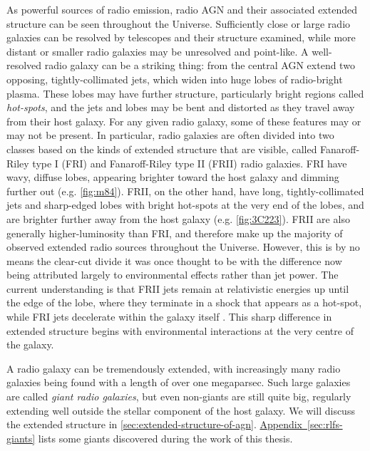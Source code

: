 \documentclass[11pt, a4paper]{book}
\newcommand{\aref}[1]{\hyperref[#1]{Appendix~\ref{#1}}}
\newcommand{\defn}[1]{\emph{#1}}
\providecommand{\DIFaddbegin}{} %
\providecommand{\DIFaddend}{} %
\providecommand{\DIFdelbegin}{} %
\providecommand{\DIFdelend}{} %
\newcommand{\DIFscaledelfig}{0.5}
\newlength{\DIFdelgraphicswidth} %
\newlength{\DIFdelgraphicsheight} %
\newcommand{\DIFaddincludegraphics}[2][]{{\color{blue}\fbox{\DIFOincludegraphics[#1]{#2}}}} %
\newcommand{\DIFdelincludegraphics}[2][]{%
\sbox{\DIFdelgraphicsbox}{\DIFOincludegraphics[#1]{#2}}%
\settoboxwidth{\DIFdelgraphicswidth}{\DIFdelgraphicsbox} %
\settoboxtotalheight{\DIFdelgraphicsheight}{\DIFdelgraphicsbox} %
\scalebox{\DIFscaledelfig}{%
\parbox[b]{\DIFdelgraphicswidth}{\usebox{\DIFdelgraphicsbox}\\[-\baselineskip] \rule{\DIFdelgraphicswidth}{0em}}\llap{\resizebox{\DIFdelgraphicswidth}{\DIFdelgraphicsheight}{%
\setlength{\unitlength}{\DIFdelgraphicswidth}%
\begin{picture}(1,1)%
\thicklines\linethickness{2pt} %
{\color[rgb]{1,0,0}\put(0,0){\framebox(1,1){}}}%
{\color[rgb]{1,0,0}\put(0,0){\line( 1,1){1}}}%
{\color[rgb]{1,0,0}\put(0,1){\line(1,-1){1}}}%
\end{picture}%
}\hspace*{3pt}}} %
} %
\DeclareRobustCommand{\DIFaddbegin}{\DIFOaddbegin \let\includegraphics\DIFaddincludegraphics} %
\DeclareRobustCommand{\DIFaddend}{\DIFOaddend \let\includegraphics\DIFOincludegraphics} %
\DeclareRobustCommand{\DIFdelbegin}{\DIFOdelbegin \let\includegraphics\DIFdelincludegraphics} %
\DeclareRobustCommand{\DIFdelend}{\DIFOaddend \let\includegraphics\DIFOincludegraphics} %
\begin{document}
        As powerful sources of radio emission, radio AGN and their associated extended structure can be seen throughout the Universe. Sufficiently close or large radio galaxies can be resolved by telescopes and their structure examined, while more distant or smaller radio galaxies may be unresolved and point-like. A well-resolved radio galaxy can be a striking thing: from the central AGN extend two opposing, tightly-collimated jets, which widen into huge lobes of radio-bright plasma. These lobes may have further structure, particularly bright regions called \defn{hot-spots}, and the jets and lobes may be bent and distorted as they travel away from their host galaxy. For any given radio galaxy, some of these features may or may not be present. In particular, radio galaxies are often divided into two classes based on the kinds of extended structure that are visible, called Fanaroff-Riley type I (FRI) and Fanaroff-Riley type II (FRII) radio galaxies. FRI have wavy, diffuse lobes, appearing brighter toward the host galaxy and dimming further out (e.g. \autoref{fig:m84}). FRII, on the other hand, have long, tightly-collimated jets and sharp-edged lobes with bright hot-spots \citep{urry95unified} at the very end of the lobes, and are brighter further away from the host galaxy (e.g. \autoref{fig:3C223}). FRII are also generally higher-luminosity \citep{fanaroff1974} than FRI, and therefore make up the majority of observed extended radio sources throughout the Universe. However, this is by no means the clear-cut divide it was once thought to be \citep{mingo_revisiting_2019} with the difference now being attributed largely to environmental effects rather than jet power. The current understanding is that FRII jets remain at relativistic energies up until the edge of the lobe, where they terminate in a shock that appears as a hot-spot, while FRI jets decelerate within the galaxy itself \citep{hardcastle20feedback}. This sharp difference in extended structure begins with environmental interactions at the very centre of the galaxy.

        A radio galaxy can be tremendously extended, with increasingly many radio galaxies being found with a length of over one megaparsec. Such large galaxies are called \defn{giant radio galaxies}, but even non-giants are still quite big, regularly extending well outside the stellar component of the host galaxy. We will discuss the extended structure in \autoref{sec:extended-structure-of-agn}. \DIFdelbegin %
\DIFdelend \DIFaddbegin \aref{sec:rlfs-giants} \DIFaddend lists some giants discovered during the work of this thesis.
\end{document}

